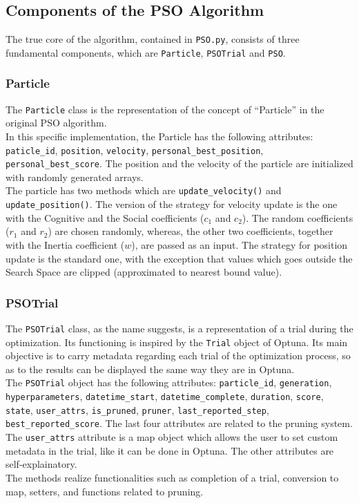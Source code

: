 \subsection{Components of the PSO Algorithm}

The true core of the algorithm, contained in \texttt{PSO.py}, consists of three fundamental components, which are \texttt{Particle}, \texttt{PSOTrial} and \texttt{PSO}.

\subsubsection{Particle}

The \texttt{Particle} class is the representation of the concept of “Particle” in the original PSO algorithm.
% 
\\[0.3cm]In this specific implementation, the Particle has the following attributes: \texttt{paticle\_id}, \texttt{position}, \texttt{velocity}, \texttt{personal\_best\_position}, \texttt{personal\_best\_score}.
The position and the velocity of the particle are initialized with randomly generated arrays.
% 
\\[0.3cm]The particle has two methods which are \texttt{update\_velocity()} and \texttt{update\_position()}. 
The version of the strategy for velocity update is the one with the Cognitive and the Social coefficients ($c_1$ and $c_2$). The random coefficients ($r_1$ and $r_2$) are chosen randomly, whereas, the other two coefficients, together with the Inertia coefficient ($w$), are passed as an input.
The strategy for position update is the standard one, with the exception that values which goes outside the Search Space are clipped (approximated to nearest bound value).

\subsubsection{PSOTrial}

The \texttt{PSOTrial} class, as the name suggests, is a representation of a trial during the optimization. Its functioning is inspired by the \texttt{Trial} object of Optuna.
Its main objective is to carry metadata regarding each trial of the optimization process, so as to the results can be displayed the same way they are in Optuna.
% 
\\[0.3cm]The \texttt{PSOTrial} object has the following attributes: \texttt{particle\_id}, \texttt{generation}, \newline\texttt{hyperparameters}, \texttt{datetime\_start}, \texttt{datetime\_complete}, \texttt{duration}, \texttt{score}, \texttt{state}, \texttt{user\_attrs}, \texttt{is\_pruned}, \texttt{pruner}, \texttt{last\_reported\_step}, \texttt{best\_reported\_score}.
The last four attributes are related to the pruning system. The \texttt{user\_attrs} attribute is a map object which allows the user to set custom metadata in the trial, like it can be done in Optuna. The other attributes are self-explainatory.
% 
\\[0.3cm]The methods realize functionalities such as completion of a trial, conversion to map, setters, and functions related to pruning.

